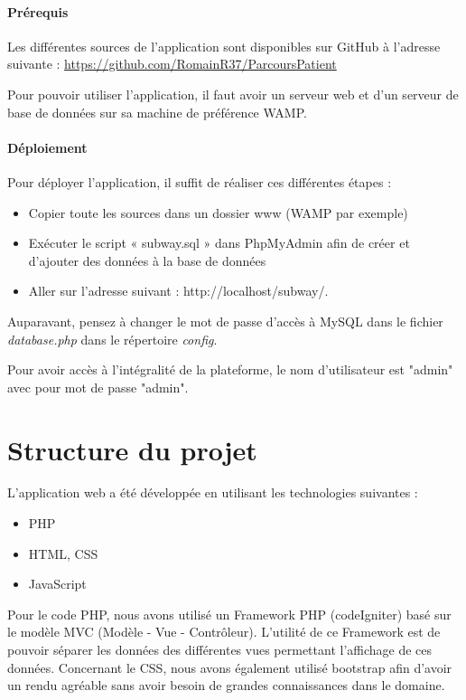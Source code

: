 \documentclass[noposter]{polytech/polytech}
\begin{document}
\paragraph{Prérequis}

Les différentes sources de l'application sont disponibles sur GitHub à l'adresse suivante :
\url{https://github.com/RomainR37/ParcoursPatient}

Pour pouvoir utiliser l'application, il faut avoir un serveur web et d'un serveur de base de données sur sa machine de préférence WAMP.

\paragraph{Déploiement}

Pour déployer l'application, il suffit de réaliser ces différentes étapes :
\begin{itemize}
	\item Copier toute les sources dans un dossier www (WAMP par exemple)
	\item Exécuter le script « subway.sql » dans PhpMyAdmin afin de créer et d'ajouter des données à la base de données 
	\item Aller sur l'adresse suivant : http://localhost/subway/.
\end{itemize}

Auparavant, pensez à changer le mot de passe d'accès à MySQL dans le fichier \textit{database.php} dans le répertoire \textit{config}.

Pour avoir accès à l'intégralité de la plateforme, le nom d'utilisateur est "admin" avec pour mot de passe "admin".

\section{Structure du projet}

L'application web a été développée en utilisant les technologies suivantes :
\begin{itemize}
	\item PHP
	\item HTML, CSS
	\item JavaScript
\end{itemize}

Pour le code PHP, nous avons utilisé un Framework PHP (codeIgniter) basé sur le modèle MVC (Modèle - Vue - Contrôleur). L'utilité de ce Framework est de pouvoir séparer les données des différentes vues permettant l'affichage de ces données. Concernant le CSS, nous avons également utilisé bootstrap afin d'avoir un rendu agréable sans avoir besoin de grandes connaissances dans le domaine.
 
\end{document}
